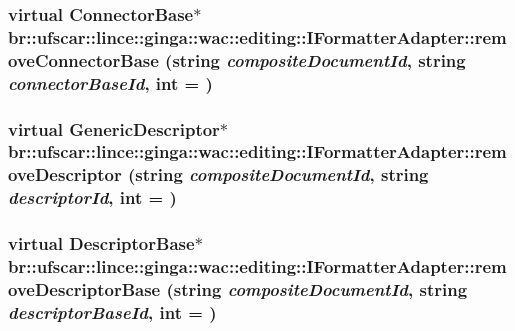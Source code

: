 \label{classbr_1_1ufscar_1_1lince_1_1ginga_1_1wac_1_1editing_1_1IFormatterAdapter_a825cefaf9055043bef55540808f736e4}
\hypertarget{classbr_1_1ufscar_1_1lince_1_1ginga_1_1wac_1_1editing_1_1IFormatterAdapter_a2a94ce80149177cdc18c4148d3d3a1c9}{
\subsubsection[{removeConnectorBase}]{\setlength{\rightskip}{0pt plus 5cm}virtual ConnectorBase$\ast$ br::ufscar::lince::ginga::wac::editing::IFormatterAdapter::removeConnectorBase (string {\em compositeDocumentId}, \/  string {\em connectorBaseId}, \/  int = {})}}
\label{classbr_1_1ufscar_1_1lince_1_1ginga_1_1wac_1_1editing_1_1IFormatterAdapter_a2a94ce80149177cdc18c4148d3d3a1c9}
\hypertarget{classbr_1_1ufscar_1_1lince_1_1ginga_1_1wac_1_1editing_1_1IFormatterAdapter_adf3f2f8459ce0ac8a6e32c9542eb937f}{
\subsubsection[{removeDescriptor}]{\setlength{\rightskip}{0pt plus 5cm}virtual GenericDescriptor$\ast$ br::ufscar::lince::ginga::wac::editing::IFormatterAdapter::removeDescriptor (string {\em compositeDocumentId}, \/  string {\em descriptorId}, \/  int = {})}}
\label{classbr_1_1ufscar_1_1lince_1_1ginga_1_1wac_1_1editing_1_1IFormatterAdapter_adf3f2f8459ce0ac8a6e32c9542eb937f}
\hypertarget{classbr_1_1ufscar_1_1lince_1_1ginga_1_1wac_1_1editing_1_1IFormatterAdapter_a1f4faecc413a705202b50da30cb2c17b}{
\subsubsection[{removeDescriptorBase}]{\setlength{\rightskip}{0pt plus 5cm}virtual DescriptorBase$\ast$ br::ufscar::lince::ginga::wac::editing::IFormatterAdapter::removeDescriptorBase (string {\em compositeDocumentId}, \/  string {\em descriptorBaseId}, \/  int = {})}}
